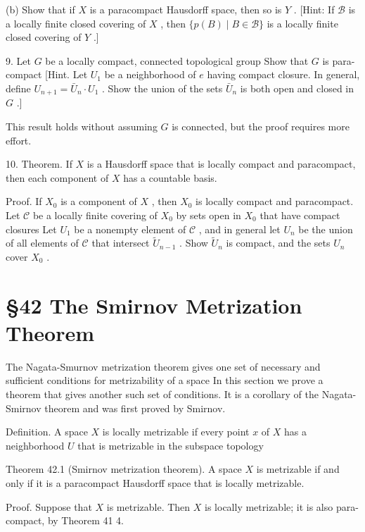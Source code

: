 \documentclass[10pt]{article}
\begin{document}
(b) Show that if \(X\) is a paracompact Hausdorff space, then so is \(Y\) . [Hint: If \(\mathcal{B}\) is a locally finite closed covering of \(X\) , then \(\{ p\left( B\right)  \mid  B \in  \mathcal{B}\}\) is a locally finite closed covering of \(Y\) .]

9. Let \(G\) be a locally compact, connected topological group Show that \(G\) is para-compact [Hint. Let \({U}_{1}\) be a neighborhood of \(e\) having compact closure. In general, define \({U}_{n + 1} = {\bar{U}}_{n} \cdot  {U}_{1}\) . Show the union of the sets \({\bar{U}}_{n}\) is both open and closed in \(G\) .]

This result holds without assuming \(G\) is connected, but the proof requires more effort.

10. Theorem. If \(X\) is a Hausdorff space that is locally compact and paracompact, then each component of \(X\) has a countable basis.

Proof. If \({X}_{0}\) is a component of \(X\) , then \({X}_{0}\) is locally compact and paracompact. Let \(\mathcal{C}\) be a locally finite covering of \({X}_{0}\) by sets open in \({X}_{0}\) that have compact closures Let \({U}_{1}\) be a nonempty element of \(\mathcal{C}\) , and in general let \({U}_{n}\) be the union of all elements of \(\mathcal{C}\) that intersect \({\widetilde{U}}_{n - 1}\) . Show \({\widetilde{U}}_{n}\) is compact, and the sets \({U}_{n}\) cover \({X}_{0}\) .

\section*{§42 The Smirnov Metrization Theorem}

The Nagata-Smurnov metrization theorem gives one set of necessary and sufficient conditions for metrizability of a space In this section we prove a theorem that gives another such set of conditions. It is a corollary of the Nagata-Smirnov theorem and was first proved by Smirnov.

Definition. A space \(X\) is locally metrizable if every point \(x\) of \(X\) has a neighborhood \(U\) that is metrizable in the subspace topology

Theorem 42.1 (Smirnov metrization theorem). A space \(X\) is metrizable if and only if it is a paracompact Hausdorff space that is locally metrizable.

Proof. Suppose that \(X\) is metrizable. Then \(X\) is locally metrizable; it is also para-compact, by Theorem 41 4.
\end{document}
